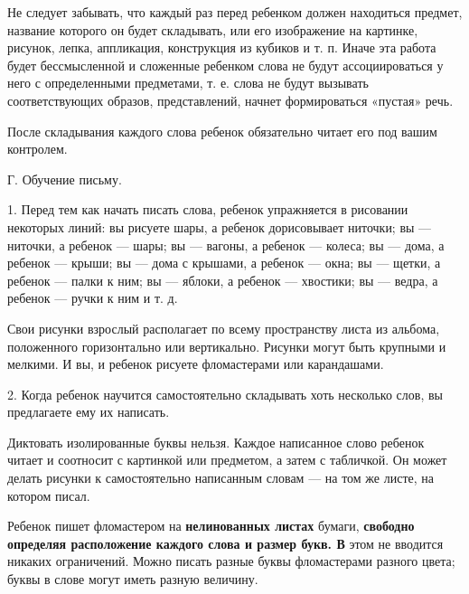 \documentclass[a5paper]{book}
\begin{document}
Не следует забывать, что каждый раз перед ребенком должен находиться
предмет, название которого он будет складывать, или его изображение на
картинке, рисунок, лепка, аппликация, конструкция из кубиков и т. п.
Иначе эта работа будет бессмысленной и сложенные ребенком слова не будут
ассоциироваться у него с определенными предметами, т. е. слова не будут
вызывать соответствующих образов, представлений, начнет формироваться
«пустая» речь.

После складывания каждого слова ребенок обязательно читает его под вашим
контролем.

Г. Обучение письму.

1. Перед тем как начать писать слова, ребенок упражняется в рисовании
некоторых линий: вы рисуете шары, а ребенок дорисовывает ниточки; вы ---
ниточки, а ребенок --- шары; вы --- вагоны, а ребенок --- колеса; вы ---
дома, а ребенок --- крыши; вы --- дома с крышами, а ребенок --- окна; вы
--- щетки, а ребенок --- палки к ним; вы --- яблоки, а ребенок ---
хвостики; вы --- ведра, а ребенок --- ручки к ним и т. д.

Свои рисунки взрослый располагает по всему пространству листа из
альбома, положенного горизонтально или вертикально. Рисунки могут быть
крупными и мелкими. И вы, и ребенок рисуете фломастерами или
карандашами.

2. Когда ребенок научится самостоятельно складывать хоть несколько слов,
вы предлагаете ему их написать.

Диктовать изолированные буквы нельзя. Каждое написанное слово ребенок
читает и соотносит с картинкой или предметом, а затем с табличкой. Он
может делать рисунки к самостоятельно написанным словам --- на том же
листе, на котором писал.

Ребенок пишет фломастером на \textbf{нелинованных листах} бумаги,
\textbf{свободно определяя расположение каждого слова и размер букв. В}
этом не вводится никаких ограничений. Можно писать разные буквы
фломастерами разного цвета; буквы в слове могут иметь разную величину.
\end{document}
